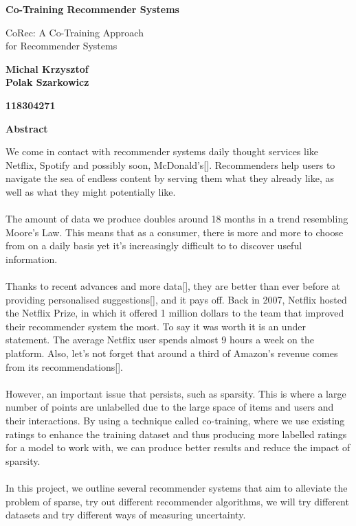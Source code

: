 \thispagestyle{plain}

\begin{center}
    \Large
    \textbf{Co-Training Recommender Systems}
    
    \vspace{0.4cm}
    \large
     CoRec: A Co-Training Approach \\ for Recommender Systems
    
    \vspace{0.4cm}
    
    \textbf{Michal Krzysztof \\ Polak Szarkowicz}
    
    \vspace{0.4cm} 
    
    \textbf{118304271}
    
    \vspace{0.9cm}
     
    \textbf{Abstract}
\end{center}
 
We come in contact with recommender systems daily thought services like Netflix, Spotify and possibly soon, McDonald’s[]. Recommenders help users to navigate the sea of endless content by serving them what they already like, as well as what they might potentially like. 
\\~\\
The amount of data we produce doubles around 18 months in a trend resembling Moore's Law. This means that as a consumer, there is more and more to choose from on a daily basis yet it's increasingly difficult to to discover useful information. 
\\~\\
Thanks to recent advances and more data[], they are better than ever before at providing personalised suggestions[], and it pays off. Back in 2007, Netflix hosted the Netflix Prize, in which it offered 1 million dollars to the team that improved their recommender system the most. To say it was worth it is an under statement. The average Netflix user spends almost 9 hours a week on the platform. Also, let's not forget that around a third of Amazon’s revenue comes from its recommendations[]. 
\\~\\
However, an important issue that persists, such as sparsity. This is where a large number of points are unlabelled due to the large space of items and users and their interactions. By using a technique called co-training, where we use existing ratings to enhance the training dataset and thus producing more labelled ratings for a model to work with, we can produce better results and reduce the impact of sparsity.
\\~\\
In this project, we outline several recommender systems that aim to alleviate the problem of sparse, try out different recommender algorithms, we will try different datasets and try different ways of measuring uncertainty.


